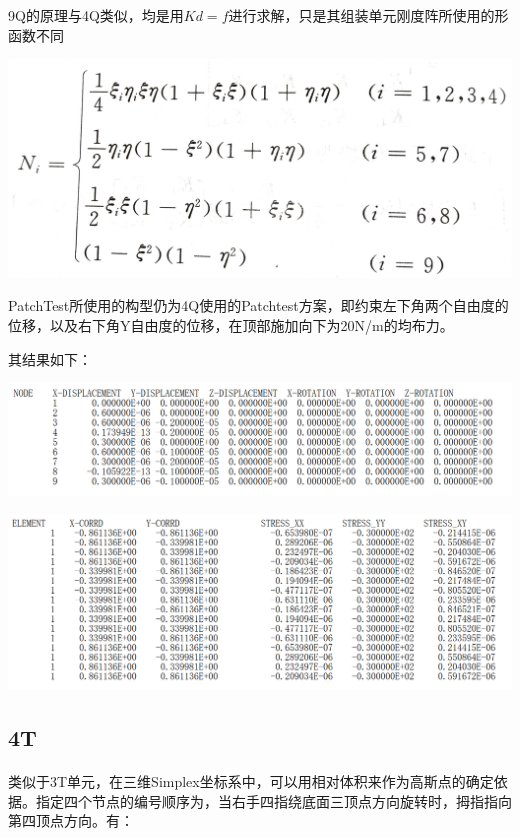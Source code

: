 \documentclass[UTF8]{ctexbook}
\begin{document}
9Q的原理与4Q类似，均是用$Kd=f$进行求解，只是其组装单元刚度阵所使用的形函数不同

\begin{center}
\includegraphics[width=\textwidth]{9Q01.jpg} %
\end{center}

PatchTest所使用的构型仍为4Q使用的Patchtest方案，即约束左下角两个自由度的位移，以及右下角Y自由度的位移，在顶部施加向下为20N/m的均布力。

其结果如下：
\begin{center}
\includegraphics[width=\textwidth]{9Q02.png} %
\end{center}
\begin{center}
\includegraphics[width=\textwidth]{9Q03.png} %
\end{center}

\subsection{4T}
\paragraph{}
类似于3T单元，在三维Simplex坐标系中，可以用相对体积来作为高斯点的确定依据。指定四个节点的编号顺序为，当右手四指绕底面三顶点方向旋转时，拇指指向第四顶点方向。有：
\end{document}
